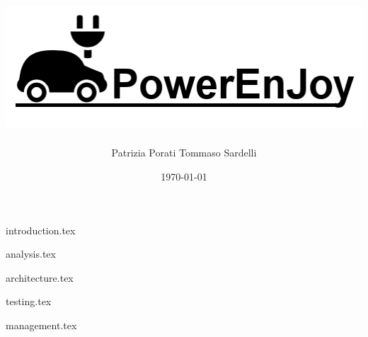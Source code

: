 \documentclass{beamer}
\author{Patrizia Porati \newline Tommaso Sardelli}
\title{\includegraphics{logo}}
\institute{Politecnico di Milano}
\date{\today}
\begin{document}
{introduction.tex}

{analysis.tex}

{architecture.tex}

{testing.tex}

{management.tex}
\end{document}

